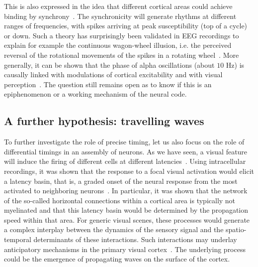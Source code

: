 \documentclass[brainsci, %
               review,submit,pdftex,moreauthors
               ]{Definitions/mdpi}
\begin{document}
This is also expressed in the idea that different cortical areas could achieve binding by synchrony~\citep{fries_mechanism_2005}. The synchronicity will generate rhythms at different ranges of frequencies, with spikes arriving at peak susceptibility (top of a cycle) or down. Such a theory has surprisingly been validated in EEG recordings to explain for example the continuous wagon-wheel illusion, i.e. the perceived reversal of the rotational movements of the spikes in a rotating wheel~\citep{vanrullen_continuous_2006}. More generally, it can be shown that the phase of alpha oscillations (about $10$ Hz) is causally linked with modulations of cortical excitability and with visual perception~\citep{dugue_phase_2011}. The question still remains open as to know if this is an epiphenomenon or a working mechanism of the neural code.
%
\subsection{A further hypothesis: travelling waves}
%
To further investigate the role of precise timing, let us also focus on the role of differential timings in an assembly of neurons. As we have seen, a visual feature will induce the firing of different cells at different latencies~\citep{celebrini_dynamics_1993}. Using intracellular recordings, it was shown that the response to a focal visual activation would elicit a latency basin, that is, a graded onset of the neural response from the most activated to neighboring neurons~\citep{bringuier_horizontal_1999}. In particular, it was shown that the network of the so-called horizontal connections within a cortical area is typically not myelinated and that this latency basin would be determined by the propagation speed within that area. For generic visual scenes, these processes would generate a complex interplay between the dynamics of the sensory signal and the spatio-temporal determinants of these interactions. Such interactions may underlay anticipatory mechanisms in the primary visual cortex~\citep{benvenuti_anticipatory_2020,le_bec_horizontal_2022}. The underlying process could be the emergence of propagating waves on the surface of the cortex.
\end{document}
